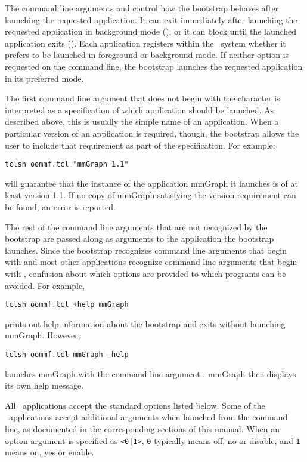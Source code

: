 The command line arguments  and  control how the
bootstrap behaves after launching the requested application.  It
can exit immediately after launching the requested application 
in background mode (), or it can block until the
launched application exits ().  Each application
registers within the \OOMMF\ system whether it prefers to be launched
in foreground or background mode.  If neither option is requested on
the command line, the bootstrap launches the requested application
in its preferred mode.

The first command line argument that does not begin with the
character \cd{+} is interpreted as a specification of which
application should be launched.  As described above, this is 
usually the simple name of an application.
When a particular
version of an application is required, though, the bootstrap
allows the user to include that requirement as part of the
specification.  For example:
\begin{verbatim}
tclsh oommf.tcl "mmGraph 1.1"
\end{verbatim}
will guarantee that the instance of the application mmGraph it
launches is of at least version 1.1.  If no copy of mmGraph
satisfying the version requirement can be found, an error is
reported.

The rest of the command line arguments that are not recognized by
the bootstrap are passed along as arguments to the application the
bootstrap launches.  Since the bootstrap recognizes command line
arguments that begin with \cd{+} and most other applications
recognize command line arguments that begin with \cd{-}, confusion
about which options are provided to which programs can be avoided.
For example,
\begin{verbatim}
tclsh oommf.tcl +help mmGraph
\end{verbatim}
prints out help information about the bootstrap and exits without
launching mmGraph.  However,
\begin{verbatim}
tclsh oommf.tcl mmGraph -help
\end{verbatim}
launches mmGraph with the command line argument .
mmGraph then displays its own help message.

All \OOMMF\ applications accept the standard options listed below.
Some of the \OOMMF\ applications accept additional arguments when
launched from the command line, as documented in the corresponding
sections of this manual.  When an option argument is specified as
\verb+<0|1>+, \verb+0+ typically means off, no or disable, and \verb+1+
means on, yes or enable.

